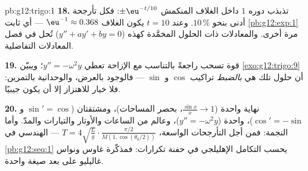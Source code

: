 \begin{solution}{pb:g12:trigo:1}
\textbf{18.} تذبذب دوره $1$ داخل الغلاف المنكمش
$\pm\eu^{-t/10}$: فكل تأرجحة أدنى بنحو $10\,\%$. وعند
$t = 10$ يكون الغلاف $\eu^{-1} \approx 0.368$ --- أي ثابت
\cref{pb:g12:exp:1} مرة أخرى. والمعادلات ذات الحلول
المخمَّدة كهذه ($y'' + a y' + b y = 0$) تُحل في فصل
المعادلات التفاضلية.

\textbf{19.} قوة تسحب راجعةً بالتناسب مع
الإزاحة تعطي $y'' = -\omega^2 y$؛ ويبيّن
\cref{exo:g12:trigo:9} أن حلول تلك 
هي \emph{بالضبط} تراكيب $\cos$ و $\sin$ ---
فالوجود بالعرض، والوحدانية بالتمرين: فلا خيار للاهتزاز
إلا أن يكون جيبيًا.

\textbf{20.} نهاية واحدة ($\frac{\sin x}{x} \to 1$، بحصر
المساحات)، ومشتقتان ($\sin' = \cos$ و
$\cos' = -\sin$)،  واحدة ($y'' = -\omega^2 y$)، وعالم
من الساعات والأوتار والتيارات والمدّ. وأما النجمة: فمن أجل
التأرجحات الواسعة، $T = 4\sqrt{\frac Lg} \cdot
\frac{\pi/2}{M(1, \cos(\theta_0/2))}$ ---
 الهندسي في \cref{pb:g12:seq:1} يحسب
التكامل الإهليلجي في حفنة تكرارات: فمذكّرة غاوس
ونواس غاليليو على بعد صيغة واحدة.
\end{solution}

